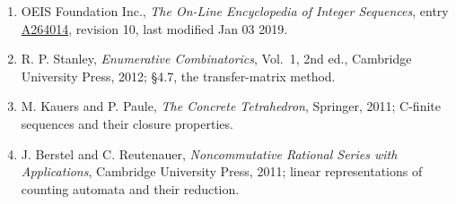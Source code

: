 \documentclass[11pt]{article}
\theoremstyle{definition}
\begin{document}
\begin{enumerate}

\item OEIS Foundation Inc., \emph{The On-Line Encyclopedia of Integer Sequences}, entry \href{https://oeis.org/A264014}{A264014}, revision 10, last modified Jan 03 2019.

\item R. P. Stanley, \emph{Enumerative Combinatorics}, Vol.~1, 2nd ed., Cambridge University Press, 2012; \S4.7, the transfer-matrix method.

\item M. Kauers and P. Paule, \emph{The Concrete Tetrahedron}, Springer, 2011; C-finite sequences and their closure properties.

\item J. Berstel and C. Reutenauer, \emph{Noncommutative Rational Series with Applications}, Cambridge University Press, 2011; linear representations of counting automata and their reduction.

\end{enumerate}
\end{document}
